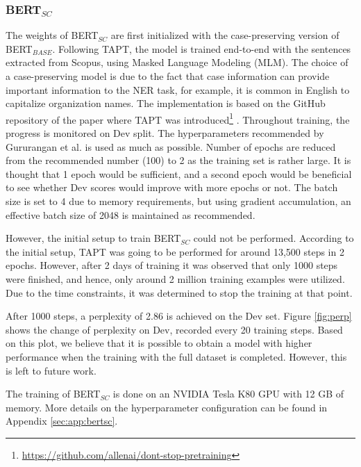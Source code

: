 \documentclass{report}
\theoremstyle{definition}
\theoremstyle{remark}
\begin{document}
\subsubsection{BERT$_{SC}$}
The weights of BERT$_{SC}$ are first initialized with the case-preserving version of BERT$_{BASE}$. Following TAPT, the model is trained end-to-end with the sentences extracted from Scopus, using Masked Language Modeling (MLM). The choice of a case-preserving model is due to the fact that case information can provide important information to the NER task, for example, it is common in English to capitalize organization names. The implementation is based on the GitHub repository of the paper where TAPT was introduced\footnote{\url{https://github.com/allenai/dont-stop-pretraining}} \cite{DontStop}. Throughout training, the progress is monitored on Dev split. The hyperparameters recommended by Gururangan et al. \cite{DontStop} is used as much as possible. Number of epochs are reduced from the recommended number (100) to 2 as the training set is rather large. It is thought that 1 epoch would be sufficient, and a second epoch would be beneficial to see whether Dev scores would improve with more epochs or not. The batch size is set to 4 due to memory requirements, but using gradient accumulation, an effective batch size of 2048 is maintained as recommended. 

However, the initial setup to train BERT$_{SC}$ could not be performed. According to the initial setup, TAPT was going to be performed for around 13,500 steps in 2 epochs. However, after 2 days of training it was observed that only 1000 steps were finished, and hence, only around 2 million training examples were utilized. Due to the time constraints, it was determined to stop the training at that point. 

After 1000 steps, a perplexity of 2.86 is achieved on the Dev set. Figure \ref{fig:perp} shows the change of perplexity on Dev, recorded every 20 training steps. Based on this plot, we believe that it is possible to obtain a model with higher performance when the training with the full dataset is completed. However, this is left to future work.

The training of BERT$_{SC}$ is done on an NVIDIA Tesla K80 GPU with 12 GB of memory. More details on the hyperparameter configuration can be found in Appendix \ref{sec:app:bertsc}.
\end{document}
